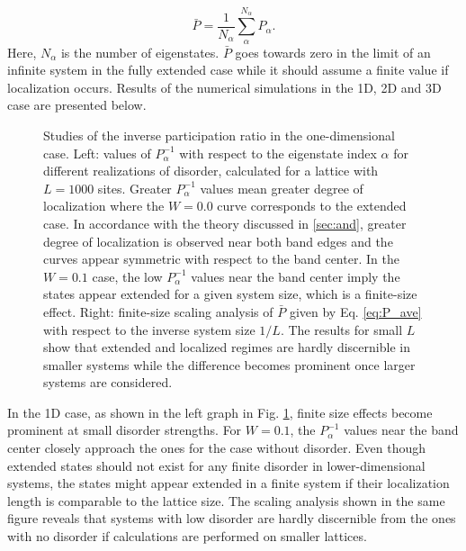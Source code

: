 \documentclass[10pt,a4paper]{article}
\begin{document}
\begin{equation}\label{eq:P_ave}
\bar{P}=\frac{1}{N_\alpha}\sum\limits_\alpha^{N_\alpha} P_\alpha.
\end{equation}
Here, $N_\alpha$ is the number of eigenstates. $\bar{P}$ goes towards zero in the limit of an infinite system in the fully extended case while it should assume a finite value if localization occurs. Results of the numerical simulations in the 1D, 2D and 3D case are presented below. 
\begin{figure}[H]
\caption{Studies of the inverse participation ratio in the one-dimensional case. Left: values of $P^{-1}_\alpha$ with respect to the eigenstate index $\alpha$ for different realizations of disorder, calculated for a lattice with $L=1000$ sites. Greater $P^{-1}_\alpha$ values mean greater degree of localization where the $W=0.0$ curve corresponds to the extended case. In accordance with the theory discussed in \autoref{sec:and}, greater degree of localization is observed near both band edges and the curves appear symmetric with respect to the band center. In the $W=0.1$ case, the low $P^{-1}_\alpha$ values near the band center imply the states appear extended for a given system size, which is a finite-size effect. Right: finite-size scaling analysis of $\bar{P}$ given by Eq. \eqref{eq:P_ave} with respect to the inverse system size $1/L$. The results for small $L$ show that extended and localized regimes are hardly discernible in smaller systems while the difference becomes prominent once larger systems are considered.   }
\label{fig:1D_ipr} 
\end{figure}
\noindent
In the 1D case, as shown in the left graph in Fig. \ref{fig:1D_ipr}, finite size effects become prominent at small disorder strengths. For $W=0.1$, the $P_\alpha^{-1}$ values near the band center closely approach the ones for the case without disorder. Even though extended states should not exist for any finite disorder in lower-dimensional systems, the states might appear extended in a finite system if their localization length is comparable to the lattice size. The scaling analysis shown in the same figure reveals that systems with low disorder are hardly discernible from the ones with no disorder if calculations are performed on smaller lattices.\\\\ 
\end{document}
